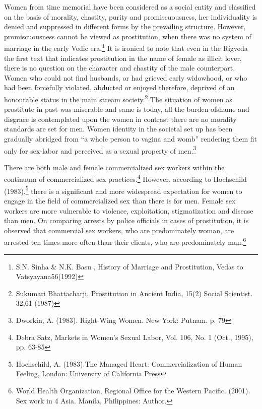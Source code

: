 \begin{multicols}{2}
\noi
Women from time memorial have been considered as a social entity and classified on the basis
of morality, chastity, purity and promiscuousness, her individuality is denied and suppressed
in different forms by the prevailing structure. However, promiscuousness cannot be viewed as
prostitution, when there was no system of marriage in the early Vedic era.\footnote{S.N. Sinha \& N.K. Basu , History of Marriage and Prostitution, Vedas to Vatsyayana56(1992)} It is ironical to
note that even in the Rigveda the first text that indicates prostitution in the name of female as
illicit lover, there is no question on the character and chastity of the male counterpart. Women
who could not find husbands, or had grieved early widowhood, or who had been forcefully
violated, abducted or enjoyed therefore, deprived of an honourable status in the main stream
society.\footnote{Sukumari Bhattacharji, Prostitution in Ancient India, 15(2) Social Scientist. 32,61 (1987)} The situation of women as prostitute in past was miserable and same is today, all the
burden ofshame and disgrace is contemplated upon the women in contrast there are no morality
standards are set for men. Women identity in the societal set up has been gradually abridged
from “a whole person to vagina and womb” rendering them fit only for sex-labor and perceived
as a sexual property of men.\footnote{Dworkin, A. (1983). Right-Wing Women. New York: Putnam. p. 79}

\noi
There are both male and female commercialized sex workers within the continuum of
commercialized sex practices.\footnote{Debra Satz, Markets in Women's Sexual Labor, Vol. 106, No. 1 (Oct., 1995), pp. 63-85} However, according to Hochschild (1983),\footnote{Hochschild, A. (1983).The Managed Heart: Commercialization of Human Feeling, London: University of
California Press} there is a significant and more widespread expectation for women to engage in the field of commercialized sex than there is for men. Female sex workers are more vulnerable to violence, exploitation, stigmatization and disease than men. On comparing arrests by police officials in cases of prostitution, it is observed that commercial sex workers, who are predominately woman, are arrested ten times more often than their clients, who are predominately man.\footnote{World Health Organization, Regional Office for the Western Pacific. (2001). Sex work in 4 Asia. Manila,
Philippines: Author.}


\end{multicols}
